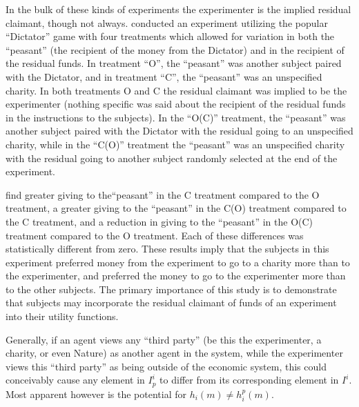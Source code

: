 \documentclass[11pt,a4paper]{report}
\begin{document}
In the bulk of these kinds of experiments the experimenter is the implied residual claimant, though not always.
\textcite{Harrison2006} conducted an experiment utilizing the popular \enquote{Dictator} game with four treatments which allowed for variation in both the \enquote{peasant} (the recipient of the money from the Dictator) and in the recipient of the residual funds.
In treatment \enquote{O}, the \enquote{peasant} was another subject paired with the Dictator, and in treatment \enquote{C}, the \enquote{peasant} was an unspecified charity.
In both treatments O and C the residual claimant was implied to be the experimenter (nothing specific was said about the recipient of the residual funds in the instructions to the subjects).
In the \enquote{O(C)} treatment, the \enquote{peasant} was another subject paired with the Dictator with the residual going to an unspecified charity, while in the \enquote{C(O)} treatment the \enquote{peasant} was an unspecified charity with the residual going to another subject randomly selected at the end of the experiment.

\textcite[196]{Harrison2006} find greater giving to the\enquote{peasant} in the C treatment compared to the O treatment, a greater giving to the \enquote{peasant} in the C(O) treatment compared to the C treatment, and a reduction in giving to the \enquote{peasant} in the O(C) treatment compared to the O treatment.
Each of these differences was statistically different from zero.
These results imply that the subjects in this experiment preferred money from the experiment to go to a charity more than to the experimenter, and preferred the money to go to the experimenter more than to the other subjects.
The primary importance of this study is to demonstrate that subjects may incorporate the residual claimant of funds of an experiment into their utility functions. 

Generally, if an agent views any \enquote{third party} (be this the experimenter, a charity, or even Nature) as another agent in the system, while the experimenter views this \enquote{third party} as being outside of the economic system, this could conceivably cause any element in $I^i_p$ to differ from its corresponding element in $I^i$.
Most apparent however is the potential for $h_i(m) \neq h_i^p(m)$.
\end{document}
